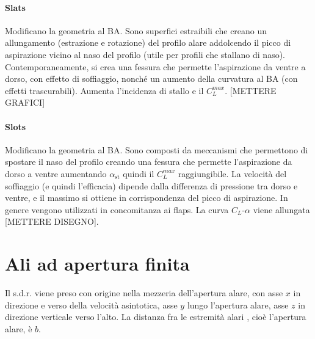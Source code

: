 \documentclass[11pt,a4paper]{report}
\begin{document}
			\subsubsection{Slats}
			Modificano la geometria al BA. Sono superfici estraibili che creano un allungamento (estrazione e rotazione) del profilo alare addolcendo il picco di aspirazione vicino al naso del profilo (utile per profili che stallano di naso). Contemporaneamente, si crea una fessura che permette l'aspirazione da ventre a dorso, con effetto di soffiaggio, nonché un aumento della curvatura al BA (con effetti trascurabili). Aumenta l'incidenza di stallo e il $C_L^{max}$. [METTERE GRAFICI]
			\subsubsection{Slots}
			Modificano la geometria al BA. Sono composti da meccanismi che permettono di spostare il naso del profilo creando una fessura che permette l'aspirazione da dorso a ventre aumentando $\alpha_\mathrm{st}$ quindi il $C_L^{max}$ raggiungibile. La velocità del soffiaggio (e quindi l'efficacia) dipende dalla differenza di pressione tra dorso e ventre, e il massimo si ottiene in corrispondenza del picco di aspirazione. In genere vengono utilizzati in concomitanza ai flaps. La curva $C_L$-$\alpha$ viene allungata [METTERE DISEGNO].
			

\chapter{Ali ad apertura finita}
Il s.d.r. viene preso con origine nella mezzeria dell'apertura alare, con asse $x$ in direzione e verso della velocità asintotica, asse $y$ lungo l'apertura alare, asse $z$ in direzione verticale verso l'alto. La distanza fra le estremità alari , cioè l'apertura alare, è $b$.\\
\end{document}
